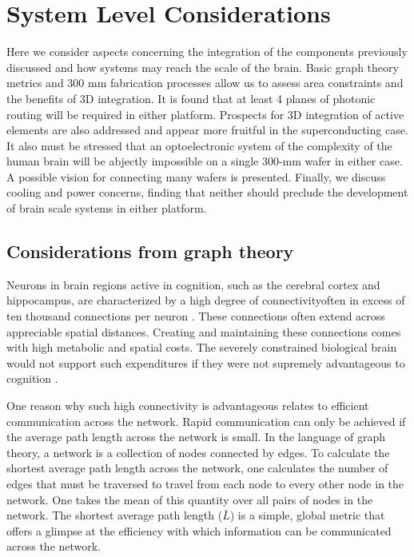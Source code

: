 \documentclass[twocolumn]{article}
\begin{document}
\section{\label{sec:instantiation}System Level Considerations}
Here we consider aspects concerning the integration of the components previously discussed and how systems may reach the scale of the brain. Basic graph theory metrics and 300 mm fabrication processes allow us to assess area constraints and the benefits of 3D integration. It is found that at least 4 planes of photonic routing will be required in either platform. Prospects for 3D integration of active elements are also addressed and appear more fruitful in the superconducting case. It also must be stressed that an optoelectronic system of the complexity of the human brain will be abjectly impossible on a single 300-mm wafer in either case. A possible vision for connecting many wafers is presented. Finally, we discuss cooling and power concerns, finding that neither should preclude the development of brain scale systems in either platform.

\subsection{Considerations from graph theory}
Neurons in brain regions active in cognition, such as the cerebral cortex and hippocampus, are characterized by a high degree of connectivity\textemdash often in excess of ten thousand connections per neuron \cite{brsc1998,bu2006}. These connections often extend across appreciable spatial distances. Creating and maintaining these connections comes with high metabolic and spatial costs. The severely constrained biological brain would not support such expenditures if they were not supremely advantageous to cognition \cite{busp2012}.

One reason why such high connectivity is advantageous relates to efficient communication across the network. Rapid communication can only be achieved if the average path length across the network is small. In the language of graph theory, a network is a collection of nodes connected by edges. To calculate the shortest average path length across the network, one calculates the number of edges that must be traversed to travel from each node to every other node in the network. One takes the mean of this quantity over all pairs of nodes in the network. The shortest average path length ($\bar{L}$) is a simple, global metric that offers a glimpse at the efficiency with which information can be communicated across the network.
\end{document}
